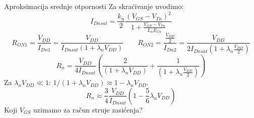 \begin{frame}[label=09_1-s032]{Aproksimacija srednje otpornosti}\setlength{\parskip}{2pt}\setlength{\abovedisplayskip}{4pt}\setlength{\belowdisplayskip}{4pt}\setlength{\abovedisplayshortskip}{3pt}\setlength{\belowdisplayshortskip}{3pt}
Za skraćivanje uvodimo:\[I_{Dnsat}=\frac{k_n}{2}\frac{(V_{GS}-V_{Tn})^2}{1+\frac{V_{GS}-V_{Tn}}{L_nE_{Cn}}}\]
\[R_{ON1}=\frac{V_{DD}}{I_{Dn1}}=\frac{V_{DD}}{I_{Dnsat}(1+\lambda_nV_{DD})}\qquad R_{ON2}=\frac{\frac{V_{DD}}2}{I_{Dn2}}=\frac{V_{DD}}{2I_{Dnsat}(1+\lambda_n\frac{V_{DD}}2)}\]
\[R_n=\frac{V_{DD}}{4I_{Dnsat}}\left(\frac2{(1+\lambda_nV_{DD})}+\frac1{(1+\lambda_n\frac{V_{DD}}2)}\right)\]
Za $\lambda_nV_{DD}\ll1$: $1/(1+\lambda_nV_{DD})\approx1-\lambda_nV_{DD}$.\[R_n\approx\frac34\frac{V_{DD}}{I_{Dnsat}}\left(1-\frac56\lambda_nV_{DD}\right)\]
\medskip\alert{Koji $V_{GS}$ uzimamo za račun struje zasićenja?}
\end{frame}

